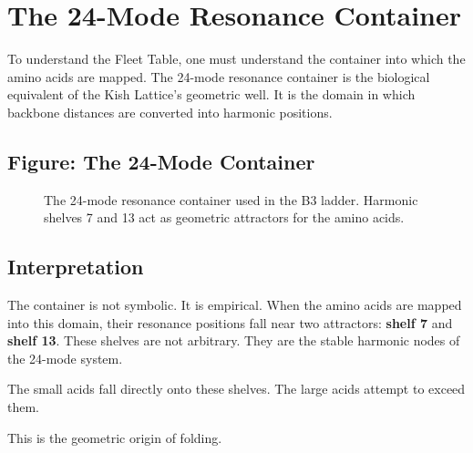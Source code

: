 \documentclass[11pt, letterpaper, openany]{book}
\begin{document}
\section{The 24-Mode Resonance Container}

To understand the Fleet Table, one must understand the container into which the
amino acids are mapped. The 24-mode resonance container is the biological
equivalent of the Kish Lattice’s geometric well. It is the domain in which
backbone distances are converted into harmonic positions.

\subsection*{Figure: The 24-Mode Container}

\begin{figure}[H]
\centering
{}
\caption{The 24-mode resonance container used in the B3 ladder. Harmonic shelves
7 and 13 act as geometric attractors for the amino acids.}
\end{figure}

\subsection*{Interpretation}

The container is not symbolic. It is empirical. When the amino acids are mapped
into this domain, their resonance positions fall near two attractors:
\textbf{shelf 7} and \textbf{shelf 13}. These shelves are not arbitrary. They are
the stable harmonic nodes of the 24-mode system.

The small acids fall directly onto these shelves.  
The large acids attempt to exceed them.

This is the geometric origin of folding.
\end{document}
